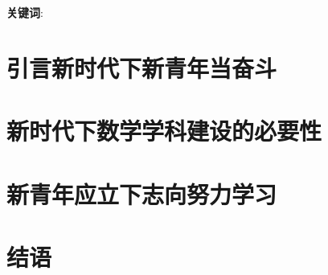 \documentclass[a4paper, 12pt]{ctexart}
\title{\TITLE}
\author{\AUTHOR}
\date{\today}
\begin{document}




    \begin{abstract}
        
    \end{abstract}

    \textbf{关键词}:
        \KEYWORDS


    \tableofcontents


    \newpage
    \pagestyle{fancy}
    
    \section*{引言\quad 新时代下新青年当奋斗}

    

    \section{新时代下数学学科建设的必要性}

    

    \section{新青年应立下志向努力学习}

    

    \section*{结语}

    


    \newpage
    
    
\end{document}
